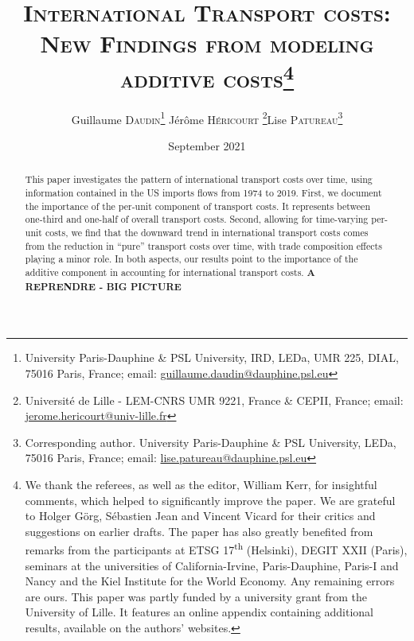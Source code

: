 \documentclass[a4paper,11pt]{article}
\begin{document}
\title{\textsc{International Transport costs:\\New Findings from modeling additive costs}\thanks{We thank the referees, as well as the editor, William Kerr, for insightful comments, which helped to significantly improve the paper. We are grateful to Holger G\"{o}rg, S\'{e}bastien Jean and Vincent Vicard for their critics and suggestions on earlier drafts. The paper has also greatly benefited from remarks from the participants at ETSG 17\textsuperscript{th} (Helsinki), DEGIT XXII (Paris), seminars at the universities of California-Irvine, Paris-Dauphine, Paris-I and Nancy and the Kiel Institute for the World Economy. Any remaining errors are ours. This paper was partly funded by a university grant from the University of Lille. It features an online appendix containing additional results, available on the authors' websites.}}

\author{Guillaume \textsc{Daudin}\thanks{%
University Paris-Dauphine \& PSL University, IRD, LEDa, UMR 225, DIAL, 75016 Paris, France; email: \url{guillaume.daudin@dauphine.psl.eu}}  \qquad J\'{e}r\^{o}me \textsc{H\'{e}ricourt} \thanks{Universit\'{e} de Lille - LEM-CNRS UMR 9221, France \& CEPII, France; email: \url{jerome.hericourt@univ-lille.fr}}\qquad Lise \textsc{Patureau}\thanks{Corresponding author.
University Paris-Dauphine \& PSL University, LEDa, 75016 Paris, France;  email: \url{lise.patureau@dauphine.psl.eu} } }


\date{September 2021}
 \maketitle
\bigskip

\begin{abstract}
This paper investigates the pattern of international transport costs over time, using information contained in the US imports flows from 1974 to 2019. First, we document the importance of the per-unit component of transport costs. It represents between one-third and one-half of overall transport costs. Second, allowing for time-varying per-unit costs, we find that the downward trend in international transport costs comes from the reduction in ``pure'' transport costs over time, with trade composition effects playing a minor role. In both aspects, our results point to the importance of the additive component in accounting for international transport costs. \textbf{A REPRENDRE - BIG PICTURE}
\end{abstract}


\thispagestyle{empty} \pagestyle{plain} \setcounter{page}{1}
\end{document}
